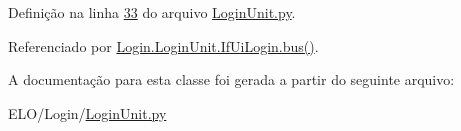 Definição na linha \hyperlink{LoginUnit_8py_source_l00033}{33} do arquivo \hyperlink{LoginUnit_8py_source}{Login\-Unit.\-py}.



Referenciado por \hyperlink{classLogin_1_1LoginUnit_1_1IfUiLogin_abab63bd2085f485ca82494db8eb5f520}{Login.\-Login\-Unit.\-If\-Ui\-Login.\-bus()}.



A documentação para esta classe foi gerada a partir do seguinte arquivo\-:\begin{DoxyCompactItemize}
\item 
E\-L\-O/\-Login/\hyperlink{LoginUnit_8py}{Login\-Unit.\-py}\end{DoxyCompactItemize}
